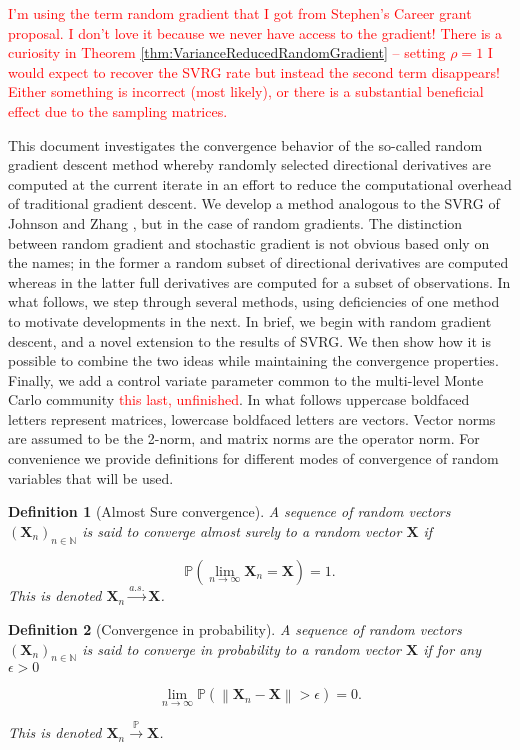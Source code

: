 \documentclass[11pt] {article}
\newcommand{\norm}[1]{\left\lVert#1\right\rVert}
\newcommand{\Prob}{\mathbb{P}}
\newcommand{\X}{\pmb{X}}
\newcommand{\convas}{\overset{a.s.}{\longrightarrow}}
\newcommand{\convp}{\overset{\Prob}{\longrightarrow}}
\newcommand{\naturals}{\mathbb{N}}
\newtheorem{definition}{Definition}
\begin{document}
\textcolor{red}{I'm using the term random gradient that I got from Stephen's Career grant proposal. I don't love it because we never have access to the gradient! There is a curiosity in Theorem \ref{thm:VarianceReducedRandomGradient} -- setting $\rho=1$ I would expect to recover the SVRG rate but instead the second term disappears! Either something is incorrect (most likely), or there is a substantial beneficial effect due to the sampling matrices.}

This document investigates the convergence behavior of the so-called random gradient descent method whereby randomly selected directional derivatives are computed at the current iterate in an effort to reduce the computational overhead of traditional gradient descent. We develop a  method analogous to the SVRG of Johnson and Zhang \cite{SVRG}, but in the case of random gradients. The distinction between random gradient and stochastic gradient is not obvious based only on the names; in the former a random subset of directional derivatives are computed whereas in the latter full derivatives are computed for a subset of observations. In what follows, we step through several methods, using deficiencies of one method to motivate developments in the next. In brief, we begin with random gradient descent, and a novel extension to the results of SVRG. We then show how it is possible to combine the two ideas while maintaining the convergence properties. Finally, we add a control variate parameter common to the multi-level Monte Carlo community \textcolor{red}{this last, unfinished}. In what follows uppercase boldfaced letters represent matrices, lowercase boldfaced letters are vectors. Vector norms are assumed to be the 2-norm, and matrix norms are the operator norm. For convenience we provide definitions for different modes of convergence of random variables that will be used.
 
 \begin{definition}[Almost Sure convergence]
 	A sequence of random vectors $(\X_n)_{n\in\naturals}$ is said to converge almost surely to a random vector $\X$ if
 	
 	\begin{equation*}
 	\Prob\left(\lim_{n\to\infty}\X_n= \X\right) = 1.
 	\end{equation*}
 	This is denoted $\X_n \convas \X$.
 \end{definition}
 
 
 \begin{definition}[Convergence in probability]
 	A sequence of random vectors $(\X_n)_{n\in\naturals}$ is said to converge in probability to a random vector $\X$ if for any $\epsilon > 0$
 	
 	\begin{equation*}
 	\lim_{n\to\infty}\mathbb{P}(\norm{\X_n-\X} > \epsilon) = 0.
 	\end{equation*}
 	
 	This is denoted $\X_n \convp \X$.
 \end{definition}
 
\end{document}
